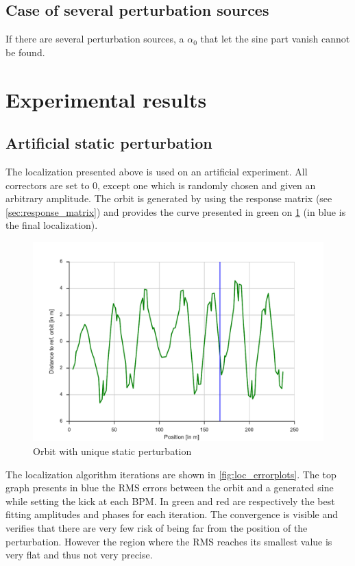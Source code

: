 \subsection{Case of several perturbation sources}
If there are several perturbation sources, a $\alpha_0$ that let the sine part vanish cannot be found.

\section{Experimental results}
\subsection{Artificial static perturbation}
The localization presented above is used on an artificial experiment. All correctors are set to 0, except one which is randomly chosen and given an arbitrary amplitude. The orbit is generated by using the response matrix (see \cref{sec:response_matrix}) and provides the curve presented in green on \cref{fig:loc_orbit} (in blue is the final localization).

\begin{figure}
    \centering
    \includegraphics[width=\linewidth]{img/loc_orbit}
    \caption{\label{fig:loc_orbit} Orbit with unique static perturbation}
\end{figure}

The localization algorithm iterations are shown in \cref{fig:loc_errorplots}. The top graph presents in blue the RMS errors between the orbit and a generated sine while setting the kick at each BPM. In green and red are respectively the best fitting amplitudes and phases for each iteration. The convergence is visible and verifies that there are very few risk of being far from the position of the perturbation. However the region where the RMS reaches its smallest value is very flat and thus not very precise.

